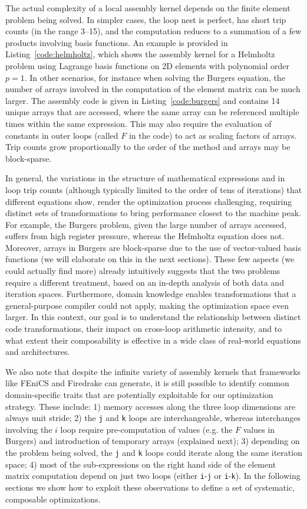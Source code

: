 The actual complexity of a local assembly kernel depends on the finite element problem being solved. In simpler cases, the loop nest is perfect, has short trip counts (in the range 3--15), and the computation reduces to a summation of a few products involving basis functions. An example is provided in Listing~\ref{code:helmholtz}, which shows the assembly kernel for a Helmholtz problem using Lagrange basis functions on 2D elements with polynomial order $p=1$. In other scenarios, for instance when solving the Burgers equation, the number of arrays involved in the computation of the element matrix can be much larger. The assembly code is given in Listing~\ref{code:burgers} and contains 14 unique arrays that are accessed, where the same array can be referenced multiple times within the same expression. This may also require the evaluation of constants in outer loops (called $F$ in the code) to act as scaling factors of arrays. Trip counts grow proportionally to the order of the method and arrays may be block-sparse.

In general, the variations in the structure of mathematical expressions and in loop trip counts (although typically limited to the order of tens of iterations) that different equations show, render the optimization process challenging, requiring distinct sets of transformations to bring performance closest to the machine peak. For example, the Burgers problem, given the large number of arrays accessed, suffers from high register pressure, whereas the Helmholtz equation does not. Moreover, arrays in Burgers are block-sparse due to the use of vector-valued basis functions (we will elaborate on this in the next sections). These few aspects (we could actually find more) already intuitively suggests that the two problems require a different treatment, based on an in-depth analysis of both data and iteration spaces. Furthermore, domain knowledge enables transformations that a general-purpose compiler could not apply, making the optimization space even larger. In this context, our goal is to understand the relationship between distinct code transformations, their impact on cross-loop arithmetic intensity, and to what extent their composability is effective in a wide class of real-world equations and architectures.

We also note that despite the infinite variety of assembly kernels that frameworks like FEniCS and Firedrake can generate, it is still possible to identify common domain-specific traits that are potentially exploitable for our optimization strategy. These include: 1) memory accesses along the three loop dimensions are always unit stride; 2) the \texttt{j} and \texttt{k} loops are interchangeable, whereas interchanges involving the $i$ loop require pre-computation of values (e.g. the $F$ values in Burgers) and introduction of temporary arrays (explained next); 3) depending on the problem being solved, the \texttt{j} and \texttt{k} loops could iterate along the same iteration space; 4) most of the sub-expressions on the right hand side of the element matrix computation depend on just two loops (either \texttt{i}-\texttt{j} or \texttt{i}-\texttt{k}). In the following sections we show how to exploit these observations to define a set of systematic, composable optimizations.

